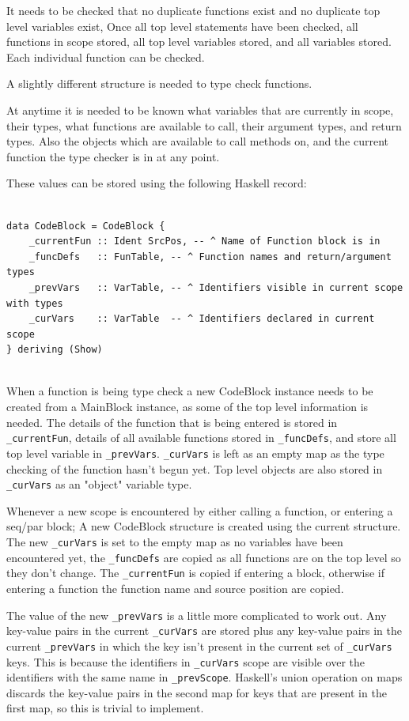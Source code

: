 It needs to be checked that no duplicate functions exist and  no duplicate top level variables exist,
Once all top level statements have been checked, all functions in scope stored, 
all top level variables stored, and all variables stored. Each individual function
can be checked.

A slightly different structure is needed to type check functions.

At anytime it is needed to be known what variables that are currently in scope, their types,
what functions are available to call, their argument types, and return types. Also the
objects which are available to call methods on, and the current function the type checker
is in at any point.

These values can be stored using the following Haskell record: 

\begin{lstlisting}[style=myHaskell]

data CodeBlock = CodeBlock {
    _currentFun :: Ident SrcPos, -- ^ Name of Function block is in
    _funcDefs   :: FunTable, -- ^ Function names and return/argument types
    _prevVars   :: VarTable, -- ^ Identifiers visible in current scope with types
    _curVars    :: VarTable  -- ^ Identifiers declared in current scope
} deriving (Show)


\end{lstlisting}

When a function is being type check a new CodeBlock instance needs to be
created from a MainBlock instance, as some of the top level information is needed.
The details of the function that is being entered is stored in \texttt{\_currentFun}, 
details of all available functions stored in \texttt{\_funcDefs}, and store all
top level variable in \texttt{\_prevVars}. \texttt{\_curVars} is left as an empty map as the
type checking of the function hasn't begun yet. Top level objects are also
stored in \texttt{\_curVars} as an "object" variable type.

Whenever a new scope is encountered by either calling a function, or entering a seq/par block;
A new CodeBlock structure is created using the current structure. The new \texttt{\_curVars}
is set to the empty map as no variables have been encountered yet, the \texttt{\_funcDefs}
are copied as all functions are on the top level so they don't change. The \texttt{\_currentFun}
is copied if entering a block, otherwise if entering a function the function name
and source position are copied. 

The value of the new \texttt{\_prevVars} is a little more complicated to work out.
Any key-value pairs in the current \texttt{\_curVars} are stored plus any key-value pairs in the 
current \texttt{\_prevVars} in which the key isn't present in the current 
set of \texttt{\_curVars} keys. This is because
the identifiers in \texttt{\_curVars} scope are visible over the identifiers with
the same name in \texttt{\_prevScope}. Haskell's union operation on maps
discards the key-value pairs in the second map for keys that are
present in the first map, so this is trivial to implement.

